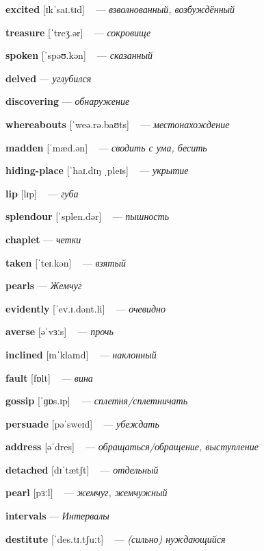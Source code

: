 \documentclass[a4paper,oneside,12pt]{amsart}
\begin{document}
{\large 

 {\bf excited } [ɪkˈsaɪ.tɪd] ~ --- \emph{ взволнованный, возбуждённый }

{\bf treasure } [ˈtreʒ.ər] ~ --- \emph{ сокровище }

{\bf spoken } [ˈspəʊ.kən] ~ --- \emph{ сказанный }

{\bf delved } --- \emph{ углубился }

{\bf discovering } --- \emph{ обнаружение }

{\bf whereabouts } [ˈweə.rə.baʊts] ~ --- \emph{ местонахождение }

{\bf madden } [ˈmæd.ən] ~ --- \emph{ сводить с ума, бесить }

{\bf hiding-place } [ˈhaɪ.dɪŋ ˌpleɪs] ~ --- \emph{ укрытие }

{\bf lip } [lɪp] ~ --- \emph{ губа }

{\bf splendour } [ˈsplen.dər] ~ --- \emph{ пышность }

{\bf chaplet } --- \emph{ четки }

{\bf taken } [ˈteɪ.kən] ~ --- \emph{ взятый }

{\bf pearls } --- \emph{ Жемчуг }

{\bf evidently } [ˈev.ɪ.dənt.li] ~ --- \emph{ очевидно }

{\bf averse } [əˈvɜːs] ~ --- \emph{ прочь }

{\bf inclined } [ɪnˈklaɪnd] ~ --- \emph{ наклонный }

{\bf fault } [fɒlt] ~ --- \emph{ вина }

{\bf gossip } [ˈɡɒs.ɪp] ~ --- \emph{ сплетня/сплетничать }

{\bf persuade } [pəˈsweɪd] ~ --- \emph{ убеждать }

{\bf address } [əˈdres] ~ --- \emph{ обращаться/обращение, выступление }

{\bf detached } [dɪˈtætʃt] ~ --- \emph{ отдельный }

{\bf pearl } [pɜːl] ~ --- \emph{ жемчуг, жемчужный }

{\bf intervals } --- \emph{ Интервалы }

{\bf destitute } [ˈdes.tɪ.tʃuːt] ~ --- \emph{ (сильно) нуждающийся }

} \vspace{6mm} {\Large 

}
\end{document}
